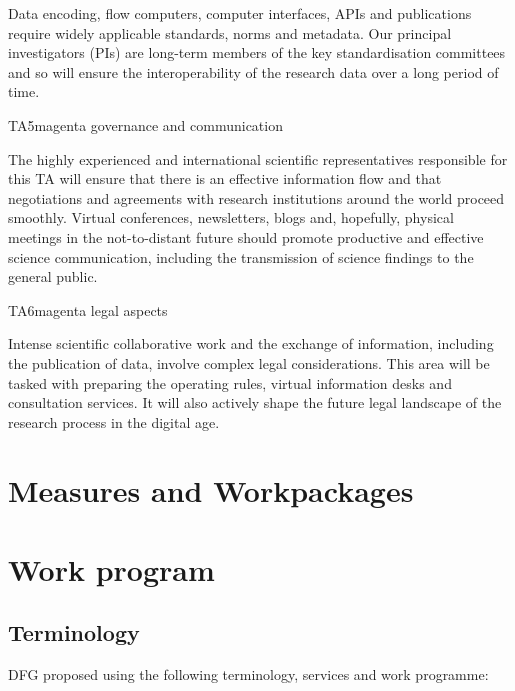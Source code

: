 \documentclass[
  english,
  paper=a4,
  oneside,captions=tableheading
]{scrbook}
\begin{document}
Data encoding, flow computers, computer interfaces, APIs and
publications require widely applicable standards, norms and metadata.
Our principal investigators (PIs) are long-term members of the key
standardisation committees and so will ensure the interoperability of
the research data over a long period of time.

\begin{awesomeblock}[magenta]{1pt}{TA5}{magenta} governance and communication\end{awesomeblock}

The highly experienced and international scientific representatives
responsible for this TA will ensure that there is an effective
information flow and that negotiations and agreements with research
institutions around the world proceed smoothly. Virtual conferences,
newsletters, blogs and, hopefully, physical meetings in the
not-to-distant future should promote productive and effective science
communication, including the transmission of science findings to the
general public.

\begin{awesomeblock}[magenta]{1pt}{TA6}{magenta} legal aspects\end{awesomeblock}

Intense scientific collaborative work and the exchange of information,
including the publication of data, involve complex legal considerations.
This area will be tasked with preparing the operating rules, virtual
information desks and consultation services. It will also actively shape
the future legal landscape of the research process in the digital age.

\hypertarget{measures-and-workpackages}{%
\section{Measures and Workpackages}\label{measures-and-workpackages}}

\hypertarget{work-program}{%
\section{Work program}\label{work-program}}

\hypertarget{terminology}{%
\subsection{Terminology}\label{terminology}}

DFG proposed using the following terminology, services and work
programme:
\end{document}
